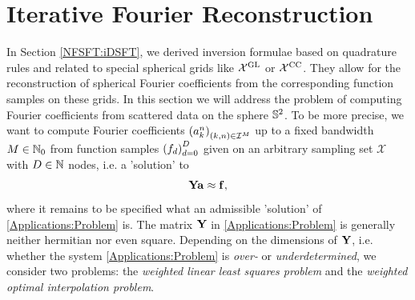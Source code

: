 \section{Iterative Fourier Reconstruction}

In Section \ref{NFSFT:iDSFT}, we derived
inversion formulae based on quadrature rules and related to special spherical 
grids like $\mathcal{X^{\mbox{\scriptsize\rm{GL}}}}$ or $\mathcal{X^{\mbox{\scriptsize\rm{CC}}}}$. They allow for the 
reconstruction of spherical Fourier coefficients from the corresponding
function samples on these grids.
In this section we will address the problem of computing Fourier coefficients from
scattered data on the sphere $\mathbb{S}^2$. To be more precise, we want to compute 
Fourier coefficients $\left(a_{k}^n\right)_{(k,n) \in \mathcal{I}^M}$ up to a fixed 
bandwidth $M \in \mathbb{N}_{0}$ from function samples $\left(f_{d}\right)_{d=0}^D$ given on an
arbitrary sampling set $\mathcal{X}$ with $D \in \mathbb{N}$ nodes, i.e. a 'solution' to
\begin{equation}
  \label{Applications:Problem}
  \mathbf{Y} \mathbf{a} \approx \mathbf{f},
\end{equation}
where it remains to be specified what an admissible 'solution' of 
\eqref{Applications:Problem} is.
The matrix $\mathbf{Y}$ in \eqref{Applications:Problem} is generally 
neither hermitian nor even square. Depending on the dimensions of $\mathbf{Y}$, i.e.
whether the system \eqref{Applications:Problem} is \emph{over-} or 
\emph{underdetermined}, we consider two problems: the 
\emph{weighted linear least squares problem} and the
\emph{weighted optimal interpolation problem}.

